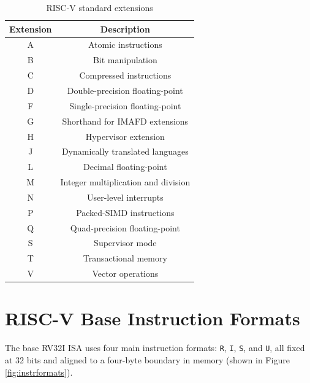 \begin{table}
  \centering
  \begin{tabular}{|c|c|}
    \hline
    \textbf{Extension} & \textbf{Description}                \\
    \hline
    A                  & Atomic instructions                 \\
    \hline
    B                  & Bit manipulation                    \\
    \hline
    C                  & Compressed instructions             \\
    \hline
    D                  & Double-precision floating-point     \\
    \hline
    F                  & Single-precision floating-point     \\
    \hline
    G                  & Shorthand for IMAFD extensions      \\
    \hline
    H                  & Hypervisor extension                \\
    \hline
    J                  & Dynamically translated languages    \\
    \hline
    L                  & Decimal floating-point              \\
    \hline
    M                  & Integer multiplication and division \\
    \hline
    N                  & User-level interrupts               \\
    \hline
    P                  & Packed-SIMD instructions            \\
    \hline
    Q                  & Quad-precision floating-point       \\
    \hline
    S                  & Supervisor mode                     \\
    \hline
    T                  & Transactional memory                \\
    \hline
    V                  & Vector operations                   \\
    \hline
  \end{tabular}
  \caption{RISC-V standard extensions}
  \label{tab:extensions}
\end{table}

\section{RISC-V Base Instruction Formats}
\label{sec:riscv_bif}

The base RV32I ISA uses four main instruction formats: \texttt{R}, \texttt{I},
\texttt{S}, and \texttt{U}, all fixed at 32 bits and aligned to a four-byte
boundary in memory (shown in Figure \ref{fig:instrformats}).

